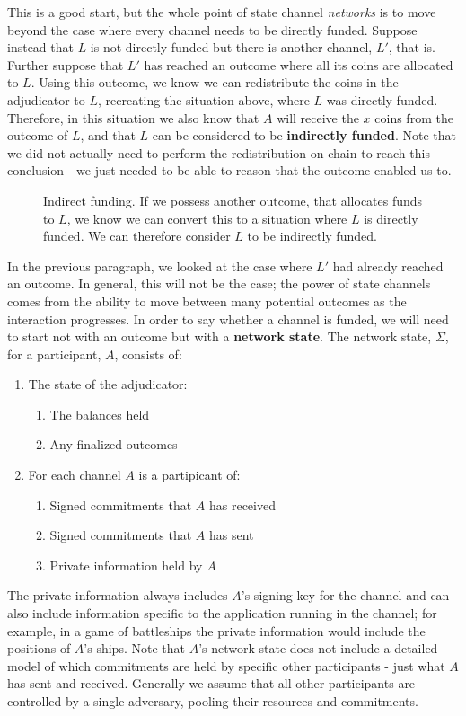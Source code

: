 This is a good start, but the whole point of state channel \textit{networks} is to move beyond the case where every channel needs to be directly funded.
Suppose instead that $L$ is not directly funded but there is another channel, $L'$, that is.
Further suppose that $L'$ has reached an outcome where all its coins are allocated to $L$.
Using this outcome, we know we can redistribute the coins in the adjudicator to $L$, recreating the situation above, where $L$ was directly funded.
Therefore, in this situation we also know that $A$ will receive the $x$ coins from the outcome of $L$, and that $L$ can be considered to be \textbf{indirectly funded}.
Note that we did not actually need to perform the redistribution on-chain to reach this conclusion - we just needed to be able to reason that the outcome enabled us to.

\begin{figure}[h]\centering
  \makebox[\textwidth][c]{}
  \caption{
    Indirect funding.
    If we possess another outcome, that allocates funds to $L$, we know we can convert this to a situation where $L$ is directly funded.
    We can therefore consider $L$ to be indirectly funded.
  }\label{fig:indirect-funding}
\end{figure}

In the previous paragraph, we looked at the case where $L'$ had already reached an outcome.
In general, this will not be the case;
the power of state channels comes from the ability to move between many potential outcomes as the interaction progresses.
In order to say whether a channel is funded, we will need to start not with an outcome but with a \textbf{network state}.
The network state, $\Sigma$, for a participant, $A$, consists of:
\begin{enumerate}
  \item The state of the adjudicator: 
  \begin{enumerate}
    \item The balances held
    \item Any finalized outcomes
  \end{enumerate}
  \item For each channel $A$ is a partipicant of:
  \begin{enumerate}
    \item Signed commitments that $A$ has received
    \item Signed commitments that $A$ has sent
    \item Private information held by $A$
  \end{enumerate}
\end{enumerate}
The private information always includes $A$'s signing key for the channel and can also include information specific to the application running in the channel;
for example, in a game of battleships the private information would include the positions of $A$'s ships.
Note that $A$'s network state does not include a detailed model of which commitments are held by specific other participants - just what $A$ has sent and received.
Generally we assume that all other participants are controlled by a single adversary, pooling their resources and commitments. 

